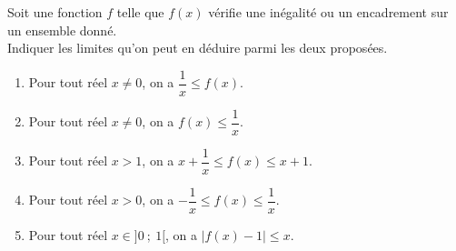 \begin{exercice}
Soit une fonction $f$ telle que $f(x)$ vérifie une \mbox{inégalité} ou un encadrement sur un ensemble donné.\\
Indiquer les limites qu'on peut en déduire parmi les deux proposées.
\begin{enumerate}
\item Pour tout réel $x\neq0$, on a $\dfrac{1}{x}\leqslant f(x)$.
\item Pour tout réel $x\neq0$, on a $f(x)\leqslant \dfrac{1}{x}$.
\item Pour tout réel $x>1$, on a $x+\dfrac{1}{x}\leqslant f(x)\leqslant x+1$.
\item Pour tout réel $x>0$, on a $-\dfrac{1}{x}\leqslant f(x)\leqslant \dfrac{1}{x}$.
\item Pour tout réel $x\in]0~;~1[$, on a $|f(x)-1|\leqslant x$.
\end{enumerate}
\end{exercice}

